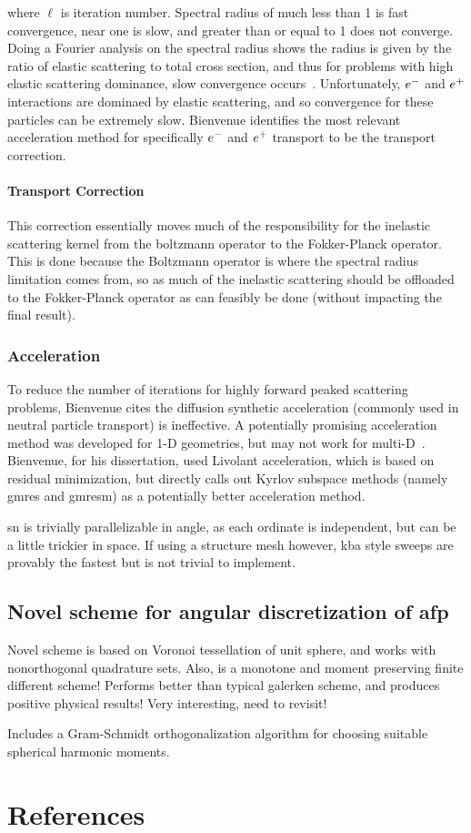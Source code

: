 where $\ell$ is iteration number. Spectral radius of much less than 1 is fast convergence, near one is slow, and greater than or equal to 1 does not converge. Doing a Fourier analysis on the spectral radius shows the radius is given by the ratio of elastic scattering to total cross section, and thus for problems with high elastic scattering dominance, slow convergence occurs~\cite{larsen_advances_2010}. Unfortunately, $e^{-}$ and $e^{+}$ interactions are dominaed by elastic scattering, and so convergence for these particles can be extremely slow. Bienvenue identifies the most relevant acceleration method for specifically $e^{-}$ and $e^{+}$ transport to be the transport correction. 

\paragraph{Transport Correction}
This correction essentially moves much of the responsibility for the inelastic scattering kernel from the boltzmann operator to the Fokker-Planck operator. This is done because the Boltzmann operator is where the spectral radius limitation comes from, so as much of the inelastic scattering should be offloaded to the Fokker-Planck operator as can feasibly be done (without impacting the final result).

\subsubsection{Acceleration}
To reduce the number of iterations for highly forward peaked scattering problems, Bienvenue cites the diffusion synthetic acceleration (commonly used in neutral particle transport) is ineffective. A potentially promising acceleration method was developed for 1-D geometries, but may not work for multi-D~\cite{morel_angular_1991}. Bienvenue, for his dissertation, used Livolant acceleration, which is based on residual minimization, but directly calls out Kyrlov subspace methods (namely \gls{gmres} and \gls{gmresm}) as a potentially better acceleration method. 

\gls{sn} is trivially parallelizable in angle, as each ordinate is independent, but can be a little trickier in space. If using a structure mesh however, \gls{kba} style sweeps are provably the fastest but is not trivial to implement.

\subsection{Novel scheme for angular discretization of \gls{afp}}
Novel scheme is based on Voronoi tessellation of unit sphere, and works with nonorthogonal quadrature sets. Also, is a monotone and moment preserving finite different scheme! Performs better than typical galerken scheme, and produces positive physical results! Very interesting, need to revisit!

Includes a Gram-Schmidt orthogonalization algorithm for choosing suitable spherical harmonic moments.

\clearpage
{}
\section*{References}
\printbibliography[heading=none]

